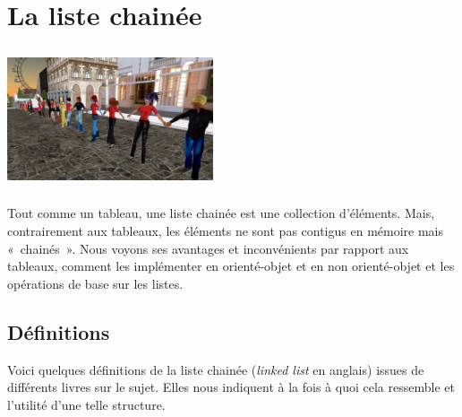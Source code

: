 \chapter{La liste chainée}

\begin{center}
	\href{http://static.commentcamarche.net/www.commentcamarche.net/faq/images/0-Anm7iJKj-dl-ex2-s-.png}
	{\includegraphics[width=6.094cm,height=4.094cm]{image/listeChainee.png}}
\end{center}

	Tout comme un tableau, une liste chainée est une collection d'éléments. 
	Mais, contrairement aux tableaux, les éléments ne sont pas contigus 
	en mémoire mais «~chainés~». Nous voyons ses avantages et inconvénients 
	par rapport aux tableaux, comment les implémenter en orienté-objet 
	et en non orienté-objet et les opérations de base sur les listes.


\section{Définitions}


	Voici quelques définitions de la liste chainée (\textit{linked list} 
	en anglais) issues de différents livres sur le
	sujet. Elles nous indiquent à la fois à quoi cela ressemble 
	et l'utilité d'une telle structure.
	
